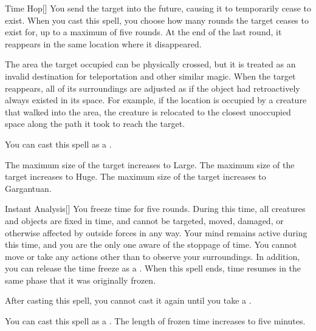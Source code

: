 \lowercase{\hypertarget{spell:Time Hop}{}}\label{spell:Time Hop}
\begin{freeability}[Rank 2]{\hypertarget{spell:Time Hop}{Time Hop}}[]
You send the target into the future, causing it to temporarily cease to exist.
When you cast this spell, you choose how many rounds the target ceases to exist for, up to a maximum of five rounds.
At the end of the last round, it reappears in the same location where it disappeared.

The area the target occupied can be physically crossed, but it is treated as an invalid destination for teleportation and other similar magic.
When the target reappears, all of its surroundings are adjusted as if the object had retroactively always existed in its space.
For example, if the location is occupied by a creature that walked into the area, the creature is relocated to the closest unoccupied space along the path it took to reach the target.

You can cast this spell as a .

\rankline
{} The maximum size of the target increases to Large.
 The maximum size of the target increases to Huge.
 The maximum size of the target increases to Gargantuan.
\end{freeability}
\vspace{0.25em}



\lowercase{\hypertarget{spell:Instant Analysis}{}}\label{spell:Instant Analysis}
\begin{freeability}[Rank 3]{\hypertarget{spell:Instant Analysis}{Instant Analysis}}[]
You freeze time for five rounds.
During this time, all creatures and objects are fixed in time, and cannot be targeted, moved, damaged, or otherwise affected by outside forces in any way.
Your mind remains active during this time, and you are the only one aware of the stoppage of time.
You cannot move or take any actions other than to observe your surroundings.
In addition, you can release the time freeze as a .
When this spell ends, time resumes in the same phase that it was originally frozen.

After casting this spell, you cannot cast it again until you take a .

\rankline
{} You can cast this spell as a .
 The length of frozen time increases to five minutes.
\end{freeability}
\vspace{0.25em}



